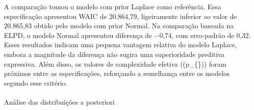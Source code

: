 \documentclass[
  brazilian,
  12pt,
  letterpaper,
  DIV=11,
  numbers=noendperiod]{scrartcl}
\makeatletter
\let\oldparagraph\paragraph
\renewcommand{\paragraph}{
    \@ifstar
      \xxxParagraphStar
      \xxxParagraphNoStar
  }
\newcommand{\xxxParagraphStar}[1]{\oldparagraph*{#1}\mbox{}}
\newcommand{\xxxParagraphNoStar}[1]{\oldparagraph{#1}\mbox{}}
\makeatother
\begin{document}
A comparação tomou o modelo com prior Laplace como referência. Essa
especificação apresentou WAIC de 20.864,79, ligeiramente inferior ao
valor de 20.865,83 obtido pelo modelo com prior Normal. Na comparação
baseada na ELPD, o modelo Normal apresentou diferença de −0,74, com
erro-padrão de 0,32. Esses resultados indicam uma pequena vantagem
relativa do modelo Laplace, embora a magnitude da diferença não sugira
uma superioridade preditiva expressiva. Além disso, os valores de
complexidade efetiva ((p\_\{\})) foram próximos entre as
especificações, reforçando a semelhança entre os modelos segundo esse
critério.

\paragraph{Análise das distribuições a
posteriori}\label{anuxe1lise-das-distribuiuxe7uxf5es-a-posteriori}
\end{document}
